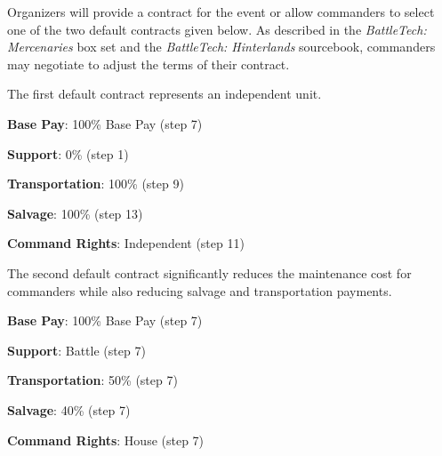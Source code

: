 Organizers will provide a contract for the event or allow commanders to select one of the two default contracts given below.
As described in the \emph{BattleTech: Mercenaries} box set and the \emph{BattleTech: Hinterlands} sourcebook, commanders may negotiate to adjust the terms of their contract.

The first default contract represents an independent unit.

\begin{description}

  \item {\bfseries Base Pay}: 100\% Base Pay (step 7)

  \item {\bfseries Support}: 0\% (step 1)

  \item {\bfseries Transportation}: 100\% (step 9)

  \item {\bfseries Salvage}: 100\% (step 13)

  \item {\bfseries Command Rights}: Independent (step 11)

\end{description}

The second default contract significantly reduces the maintenance cost for commanders while also reducing salvage and transportation payments.

\begin{description}

  \item {\bfseries Base Pay}: 100\% Base Pay (step 7)

  \item {\bfseries Support}: Battle (step 7)

  \item {\bfseries Transportation}: 50\% (step 7)

  \item {\bfseries Salvage}: 40\% (step 7)

  \item {\bfseries Command Rights}: House (step 7)

\end{description}
